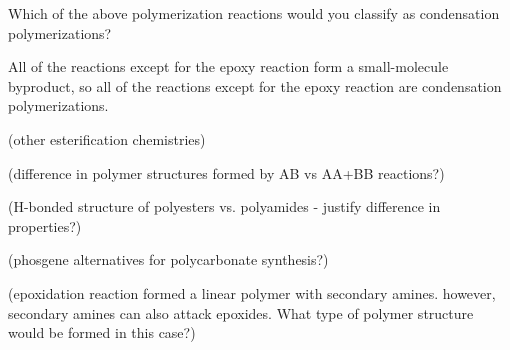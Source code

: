 \begin{activity}
\begin{ctqs}
		\vspace{0.25in}
		\question Which of the above polymerization reactions would you classify as condensation polymerizations?
			
				\begin{solution}[2in]
					All of the reactions except for the epoxy reaction form a small-molecule byproduct, so all of the reactions except for the epoxy reaction are condensation polymerizations.
				\end{solution}
			
\end{ctqs}
	

\clearpage
\begin{exercises}

		\exercise (other esterification chemistries)
		
		\exercise (difference in polymer structures formed by AB vs AA+BB reactions?)
		
		\exercise (H-bonded structure of polyesters vs. polyamides - justify difference in properties?)
		
		\exercise (phosgene alternatives for polycarbonate synthesis?)
		
		\exercise (epoxidation reaction formed a linear polymer with secondary amines.  however, secondary amines can also attack epoxides.  What type of polymer structure would be formed in this case?)
		
\end{exercises}
	
\end{activity}